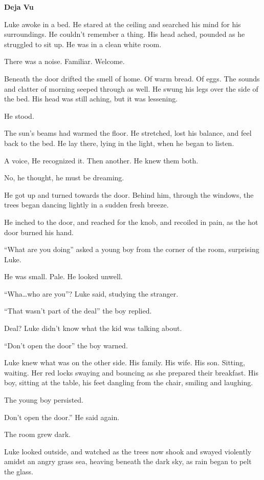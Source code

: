 {\bf Deja Vu}



Luke awoke in a bed. He stared at the ceiling and searched his mind
for his surroundings. He couldn't remember a thing. His head
ached, pounded as he struggled to sit up. He was in a clean white
room.

There was a noise. Familiar. Welcome.

Beneath the door drifted the smell of home. Of warm bread. Of eggs.
The sounds and clatter of morning seeped through as well. He swung
his legs over the side of the bed. His head was still aching, but
it was lessening.

He stood.

The sun's beams had warmed the floor. He stretched, lost his
balance, and feel back to the bed. He lay there, lying in the
light, when he began to listen.

A voice, He recognized it. Then another. He knew them both.

No, he thought, he must be dreaming.

He got up and turned towards the door. Behind him, through the
windows, the trees began dancing lightly in a sudden fresh
breeze.

He inched to the door, and reached for the knob, and recoiled in
pain, as the hot door burned his hand.

``What are you doing'' asked a young boy from the corner
of the room, surprising Luke.

He was small. Pale. He looked unwell.

``Wha{\ldots}who are you''? Luke said, studying the
stranger.

``That wasn't part of the deal'' the boy
replied.

Deal? Luke didn't know what the kid was talking about.

``Don't open the door'' the boy warned.

Luke knew what was on the other side. His family. His wife. His
son. Sitting, waiting. Her red locks swaying and bouncing as she
prepared their breakfast. His boy, sitting at the table, his feet
dangling from the chair, smiling and laughing.

The young boy persisted.

Don't open the door.'' He said again.

The room grew dark.

Luke looked outside, and watched as the trees now shook and swayed
violently amidst an angry grass sea, heaving beneath the dark sky,
as rain began to pelt the glass.

